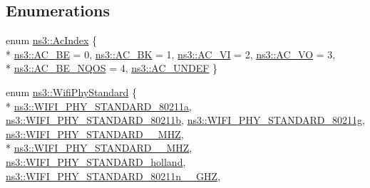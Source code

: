 \subsection*{Enumerations}
\begin{DoxyCompactItemize}
\item 
enum \hyperlink{group__wifi_gab422b4562ba272b39a9b6bca3513f3ac}{ns3\+::\+Ac\+Index} \{ \\*
\hyperlink{group__wifi_ggab422b4562ba272b39a9b6bca3513f3aca136016fc12611734060b599355503c29}{ns3\+::\+A\+C\+\_\+\+BE} = 0, 
\hyperlink{group__wifi_ggab422b4562ba272b39a9b6bca3513f3aca53e99420c645076e74307112d73eb38b}{ns3\+::\+A\+C\+\_\+\+BK} = 1, 
\hyperlink{group__wifi_ggab422b4562ba272b39a9b6bca3513f3aca1c60bd99c5ede59bb50b91182cb81d0f}{ns3\+::\+A\+C\+\_\+\+VI} = 2, 
\hyperlink{group__wifi_ggab422b4562ba272b39a9b6bca3513f3aca147b7f007ca5459e52ee93d1ebe83639}{ns3\+::\+A\+C\+\_\+\+VO} = 3, 
\\*
\hyperlink{group__wifi_ggab422b4562ba272b39a9b6bca3513f3aca0ed29144b73a7cd671df98db388893d2}{ns3\+::\+A\+C\+\_\+\+B\+E\+\_\+\+N\+Q\+OS} = 4, 
\hyperlink{group__wifi_ggab422b4562ba272b39a9b6bca3513f3aca5cd2787988e927218889c6b7bb0901c3}{ns3\+::\+A\+C\+\_\+\+U\+N\+D\+EF}
 \}
\item 
enum \hyperlink{group__wifi_ga1299834f4e1c615af3ca738033b76a49}{ns3\+::\+Wifi\+Phy\+Standard} \{ \\*
\hyperlink{group__wifi_gga1299834f4e1c615af3ca738033b76a49a22db1e8022db2c3450414b86c77b11e4}{ns3\+::\+W\+I\+F\+I\+\_\+\+P\+H\+Y\+\_\+\+S\+T\+A\+N\+D\+A\+R\+D\+\_\+80211a}, 
\hyperlink{group__wifi_gga1299834f4e1c615af3ca738033b76a49a77e1cc9f77a0bce8e2bc82cbef437b5a}{ns3\+::\+W\+I\+F\+I\+\_\+\+P\+H\+Y\+\_\+\+S\+T\+A\+N\+D\+A\+R\+D\+\_\+80211b}, 
\hyperlink{group__wifi_gga1299834f4e1c615af3ca738033b76a49aeda6d90f260393ce003ec4765d8100af}{ns3\+::\+W\+I\+F\+I\+\_\+\+P\+H\+Y\+\_\+\+S\+T\+A\+N\+D\+A\+R\+D\+\_\+80211g}, 
\hyperlink{group__wifi_gga1299834f4e1c615af3ca738033b76a49aff863c98db467eb76170dc8bbe743de7}{ns3\+::\+W\+I\+F\+I\+\_\+\+P\+H\+Y\+\_\+\+S\+T\+A\+N\+D\+A\+R\+D\+\_\+\_\+M\+HZ}, 
\\*
\hyperlink{group__wifi_gga1299834f4e1c615af3ca738033b76a49a8311083bdd8ae58e73ab6e81a53fd7be}{ns3\+::\+W\+I\+F\+I\+\_\+\+P\+H\+Y\+\_\+\+S\+T\+A\+N\+D\+A\+R\+D\+\_\+\_\+M\+HZ}, 
\hyperlink{group__wifi_gga1299834f4e1c615af3ca738033b76a49aca926d77ddca0fc6d8cdcb190b2e520e}{ns3\+::\+W\+I\+F\+I\+\_\+\+P\+H\+Y\+\_\+\+S\+T\+A\+N\+D\+A\+R\+D\+\_\+holland}, 
\hyperlink{group__wifi_gga1299834f4e1c615af3ca738033b76a49a6e449a5ca14fc7c0eb36064ce04a5192}{ns3\+::\+W\+I\+F\+I\+\_\+\+P\+H\+Y\+\_\+\+S\+T\+A\+N\+D\+A\+R\+D\+\_\+80211n\+\_\+\_\+G\+HZ}, 

\end{DoxyCompactItemize}
